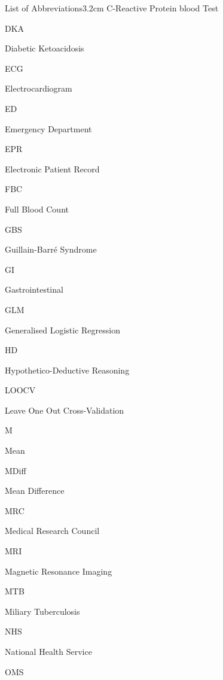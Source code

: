 \documentclass[a4paper, nobind]{templates/ociamthesis}
\begin{document}
\begin{romanpages}
\begin{mclistof}{List of Abbreviations}{3.2cm}
C-Reactive Protein blood Test

\item[DKA]

Diabetic Ketoacidosis

\item[ECG]

Electrocardiogram

\item[ED]

Emergency Department

\item[EPR]

Electronic Patient Record

\item[FBC]

Full Blood Count

\item[GBS]

Guillain-Barré Syndrome

\item[GI]

Gastrointestinal

\item[GLM]

Generalised Logistic Regression

\item[HD]

Hypothetico-Deductive Reasoning

\item[LOOCV]

Leave One Out Cross-Validation

\item[M]

Mean

\item[MDiff]

Mean Difference

\item[MRC]

Medical Research Council

\item[MRI]

Magnetic Resonance Imaging

\item[MTB]

Miliary Tuberculosis

\item[NHS]

National Health Service

\item[OMS]


\end{mclistof}
\end{romanpages}
\end{document}
